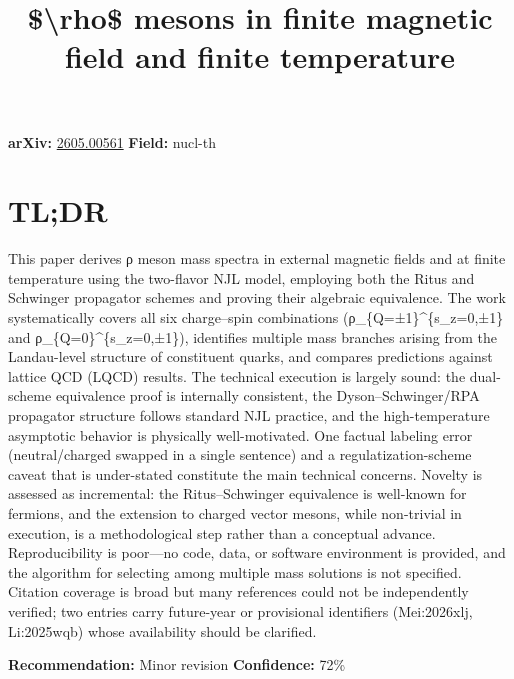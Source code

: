 \documentclass[11pt]{article}
\title{\$\textbackslash{}rho\$ mesons in finite magnetic field and finite temperature}
\date{}
\begin{document}
\maketitle

\noindent\textbf{arXiv:} \href{https://arxiv.org/abs/2605.00561}{2605.00561} \quad \textbf{Field:} nucl-th\\

\section*{TL;DR}
This paper derives ρ meson mass spectra in external magnetic fields and at finite temperature using the two-flavor NJL model, employing both the Ritus and Schwinger propagator schemes and proving their algebraic equivalence. The work systematically covers all six charge–spin combinations (ρ\_\{Q=±1\}\^{}\{s\_z=0,±1\} and ρ\_\{Q=0\}\^{}\{s\_z=0,±1\}), identifies multiple mass branches arising from the Landau-level structure of constituent quarks, and compares predictions against lattice QCD (LQCD) results. The technical execution is largely sound: the dual-scheme equivalence proof is internally consistent, the Dyson–Schwinger/RPA propagator structure follows standard NJL practice, and the high-temperature asymptotic behavior is physically well-motivated. One factual labeling error (neutral/charged swapped in a single sentence) and a regulatization-scheme caveat that is under-stated constitute the main technical concerns. Novelty is assessed as incremental: the Ritus–Schwinger equivalence is well-known for fermions, and the extension to charged vector mesons, while non-trivial in execution, is a methodological step rather than a conceptual advance. Reproducibility is poor—no code, data, or software environment is provided, and the algorithm for selecting among multiple mass solutions is not specified. Citation coverage is broad but many references could not be independently verified; two entries carry future-year or provisional identifiers (Mei:2026xlj, Li:2025wqb) whose availability should be clarified.

\textbf{Recommendation:} Minor revision \quad \textbf{Confidence:} 72\%\\
\end{document}
